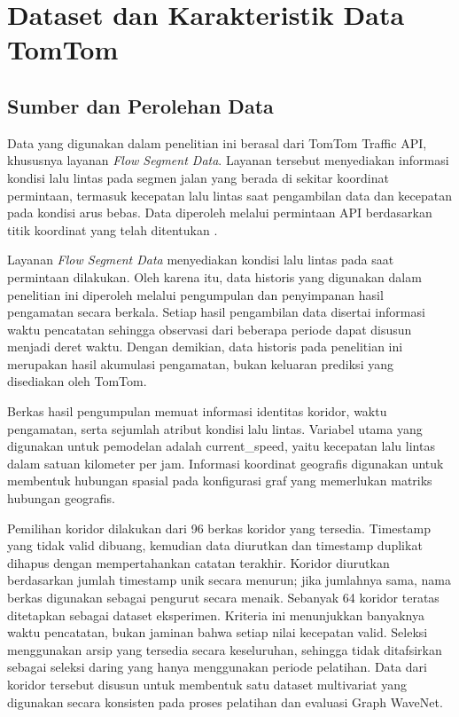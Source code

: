 \section{Dataset dan Karakteristik Data TomTom}
\label{sec:dataset_tomtom}

\subsection{Sumber dan Perolehan Data}
\label{subsec:sumber_data}

Data yang digunakan dalam penelitian ini berasal dari TomTom Traffic API, khususnya layanan \textit{Flow Segment Data}. Layanan tersebut menyediakan informasi kondisi lalu lintas pada segmen jalan yang berada di sekitar koordinat permintaan, termasuk kecepatan lalu lintas saat pengambilan data dan kecepatan pada kondisi arus bebas. Data diperoleh melalui permintaan API berdasarkan titik koordinat yang telah ditentukan \cite{tomtomflowapi}.

Layanan \textit{Flow Segment Data} menyediakan kondisi lalu lintas pada saat permintaan dilakukan. Oleh karena itu, data historis yang digunakan dalam penelitian ini diperoleh melalui pengumpulan dan penyimpanan hasil pengamatan secara berkala. Setiap hasil pengambilan data disertai informasi waktu pencatatan sehingga observasi dari beberapa periode dapat disusun menjadi deret waktu. Dengan demikian, data historis pada penelitian ini merupakan hasil akumulasi pengamatan, bukan keluaran prediksi yang disediakan oleh TomTom.

Berkas hasil pengumpulan memuat informasi identitas koridor, waktu pengamatan, serta sejumlah atribut kondisi lalu lintas. Variabel utama yang digunakan untuk pemodelan adalah \textrm{current\_speed}, yaitu kecepatan lalu lintas dalam satuan kilometer per jam. Informasi koordinat geografis digunakan untuk membentuk hubungan spasial pada konfigurasi graf yang memerlukan matriks hubungan geografis.

Pemilihan koridor dilakukan dari 96 berkas koridor yang tersedia. Timestamp yang tidak valid dibuang, kemudian data diurutkan dan timestamp duplikat dihapus dengan mempertahankan catatan terakhir. Koridor diurutkan berdasarkan jumlah timestamp unik secara menurun; jika jumlahnya sama, nama berkas digunakan sebagai pengurut secara menaik. Sebanyak 64 koridor teratas ditetapkan sebagai dataset eksperimen. Kriteria ini menunjukkan banyaknya waktu pencatatan, bukan jaminan bahwa setiap nilai kecepatan valid. Seleksi menggunakan arsip yang tersedia secara keseluruhan, sehingga tidak ditafsirkan sebagai seleksi daring yang hanya menggunakan periode pelatihan. Data dari koridor tersebut disusun untuk membentuk satu dataset multivariat yang digunakan secara konsisten pada proses pelatihan dan evaluasi Graph WaveNet.


